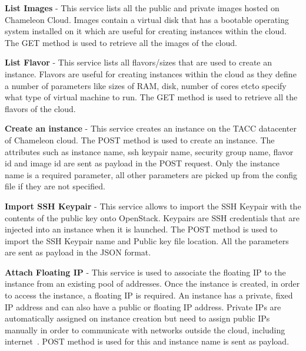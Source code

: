 \begin{description}
   \item \textbf{List Images} - This service lists all the public and private
   images hosted on Chameleon Cloud. Images contain a virtual disk that has a
   bootable operating system installed on it which are useful for creating
   instances within the cloud. The GET method is used to retrieve all the 
   images of the cloud. 

   \item \textbf{List Flavor} - This service lists all flavors/sizes that are
   used to create an instance. Flavors are useful for creating instances within
   the cloud as they define a number of parameters like sizes of RAM, disk,
   number of cores etc\. to specify what type of virtual machine to run. The 
   GET method is used to retrieve all the flavors of the cloud. 

   \item \textbf{Create an instance} - This service creates an instance on the
   TACC datacenter of Chameleon cloud. The POST method is used to create an
   instance. The attributes such as instance name, ssh keypair name, security
   group name, flavor id and image id are sent as payload in the POST request.
   Only the instance name is a required parameter, all other parameters are
   picked up from the config file if they are not specified. 

   \item \textbf{Import SSH Keypair} - This service allows to import the SSH
   Keypair with the contents of the public key onto OpenStack. Keypairs are SSH
   credentials that are injected into an instance when it is launched. The POST
   method is used to import the SSH Keypair name and Public key file location.
   All the parameters are sent as payload in the JSON format. 

   \item \textbf{Attach Floating IP} - This service is used to associate the
   floating IP to the instance from an existing pool of addresses. Once the
   instance is created, in order to access the instance, a floating IP is
   required. An instance has a private, fixed IP address and can also have a
   public or floating IP address. Private IPs are automatically assigned on
   instance creation but need to assign public IPs manually in order to
   communicate with networks outside the cloud, including
   internet~\cite{hid-sp18-516-www-manageips}. POST method is used for this 
   and instance name is sent as payload. 


\end{description}
